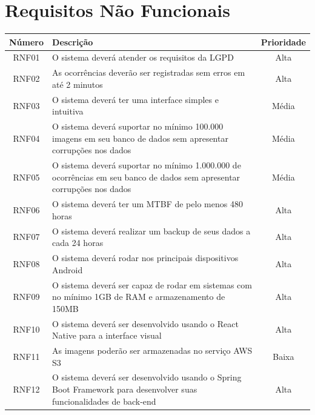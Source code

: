 
\chapter{Requisitos Não Funcionais}

\begin{quadro}[htb]
	\caption{\label{requisitos_nao_funcionais}Requisitos Não Funcionais}
	\begin{tabular}{|c|>{\centering\arraybackslash}m{9cm}|c|}
		\hline
		\textbf{Número} & \textbf{Descrição} & \textbf{Prioridade}\\\hline
		RNF01 & O sistema deverá atender os requisitos da LGPD & Alta \\ \hline
		RNF02 & As ocorrências deverão ser registradas sem erros em até 2 minutos & Alta \\ \hline
		RNF03 & O sistema deverá ter uma interface simples e intuitiva & Média \\ \hline
		RNF04 & O sistema deverá suportar no mínimo 100.000 imagens em seu banco de dados sem apresentar corrupções nos dados & Média \\ \hline
		RNF05 & O sistema deverá suportar no mínimo 1.000.000 de ocorrências em seu banco de dados sem apresentar corrupções nos dados & Média \\ \hline
		RNF06 & O sistema deverá ter um MTBF de pelo menos 480 horas & Alta \\ \hline
		RNF07 & O sistema deverá realizar um backup de seus dados a cada 24 horas & Alta \\ \hline
		RNF08 & O sistema deverá rodar nos principais dispositivos Android & Alta \\ \hline
		RNF09 & O sistema deverá ser capaz de rodar em sistemas com no mínimo 1GB de RAM e armazenamento de 150MB & Alta \\ \hline
		RNF10 & O sistema deverá ser desenvolvido usando o React Native para a interface visual & Alta \\ \hline
		RNF11 & As imagens poderão ser armazenadas no serviço AWS S3 & Baixa \\ \hline
		RNF12 & O sistema deverá ser desenvolvido usando o Spring Boot Framework para desenvolver suas funcionalidades de back-end & Alta \\ \hline
	\end{tabular}
\end{quadro}
